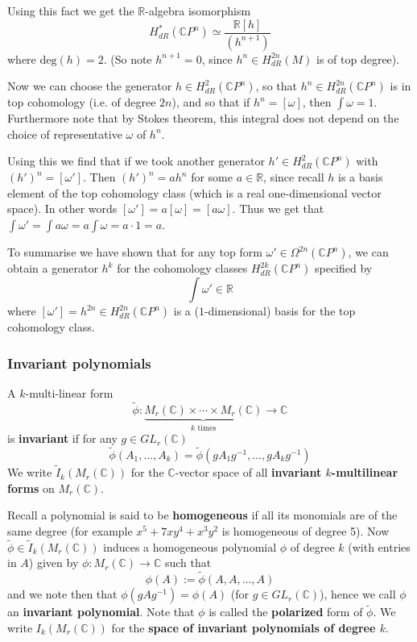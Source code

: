 \documentclass[a4paper]{article}
\theoremstyle{definition} \newtheorem*{definition}{Definition}
\theoremstyle{definition} \newtheorem*{definitions}{Definitions}
\theoremstyle{plain} \newtheorem{theorem}{Theorem}[section]
\theoremstyle{plain} \newtheorem{proposition}[theorem]{Proposition}
\theoremstyle{plain} \newtheorem{corollary}[theorem]{Corollary}
\theoremstyle{plain} \newtheorem{lemma}[theorem]{Lemma}
\theoremstyle{plain} \newtheorem{example}[theorem]{Example}
\newcommand{\defn}[1]{\textbf{#1}}
\newcommand{\realnos}{\mathbb{R}}
\newcommand{\complexnos}{\mathbb{C}}
\begin{document}
Using this fact we get the $\realnos$-algebra isomorphism
$$H^*_{dR}(\complexnos P^n) \simeq \frac{\realnos [h]}{(h^{n+1})}$$
where $\text{deg}(h)=2$. (So note $h^{n+1}=0$, since $h^n\in H_{dR}^{2n}(M)$ is of top degree). 

Now we can choose the generator $h\in H^2_{dR}(\complexnos P^n)$, so that $h^n\in H^{2n}_{dR}(\complexnos P^n)$ is in top cohomology (i.e. of degree $2n$), and so that if $h^n=[\omega]$, then $\int \omega = 1$. Furthermore note that by Stokes theorem, this integral does not depend on the choice of representative $\omega$ of $h^n$. 

Using this we find that if we took another generator $h'\in H^{2}_{dR}(\complexnos P^n)$ with $(h')^n=[\omega ']$. Then $(h')^n=ah^n$ for some $a\in \realnos$, since recall $h$ is a basis element of the top cohomology class (which is a real one-dimensional vector space). In other words $[\omega ']=a[\omega] = [a\omega]$. Thus we get that $\int \omega' = \int a\omega = a \int \omega = a\cdot 1 = a$. 

To summarise we have shown that for any top form $\omega'\in \Omega^{2n}(\complexnos P^n)$, we can obtain a generator $h^k$ for the cohomology classes $H^{2k}_{dR}(\complexnos P^n)$ specified by 
$$\int \omega' \in \realnos$$
where $[\omega ']=h^{2n}\in H^{2n}_{dR}(\complexnos P^n)$ is a ($1$-dimensional) basis for the top cohomology class.

\subsubsection{Invariant polynomials}

A $k$-multi-linear form $$\tilde{\phi}:\underbrace{M_r(\complexnos)\times \cdots \times M_r(\complexnos)}_{k \text{ times}}\to \complexnos$$
is \defn{invariant} if for any $g\in GL_r(\complexnos)$
$$\tilde{\phi}(A_1, \ldots, A_k) = \tilde{\phi}(gA_1g^{-1}, \ldots, gA_kg^{-1})$$
We write $\tilde{I}_k(M_r(\complexnos))$ for the $\complexnos$-vector space of all \defn{invariant $k$-multilinear forms} on $M_r(\complexnos)$. 

Recall a polynomial is said to be \defn{homogeneous} if all its monomials are of the same degree (for example $x^5 + 7xy^4 + x^3y^2$ is homogeneous of degree 5). Now $\tilde{\phi}\in \tilde{I}_k(M_r(\complexnos))$ induces a homogeneous polynomial $\phi$ of degree $k$ (with entries in $A$) given by $\phi:M_r(\complexnos)\to \complexnos$ such that
$$\phi(A):=\tilde{\phi}(A, A, \ldots, A)$$
and we note then that $\phi(gAg^{-1})=\phi(A)$ (for $g\in GL_r(\complexnos)$), hence we call $\phi$ an \defn{invariant polynomial}. Note that $\phi$ is called the \defn{polarized} form of $\tilde{\phi}$. We write $I_k(M_r(\complexnos))$ for the \defn{space of invariant polynomials of degree $k$}. 
\end{document}
